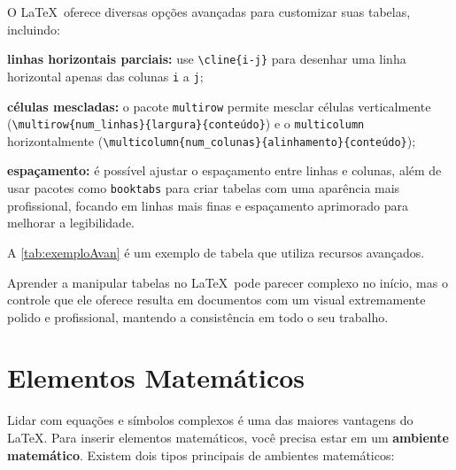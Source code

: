 O \LaTeX\  oferece diversas opções avançadas para customizar suas tabelas, incluindo:

\begin{alineas}
	\item \textbf{linhas horizontais parciais:} use \texttt{\textbackslash cline\{i-j\}} para desenhar uma linha horizontal apenas das colunas \texttt{i} a \texttt{j};
	\item \textbf{células mescladas:} o pacote \texttt{multirow} permite mesclar células verticalmente\\ (\texttt{\textbackslash multirow\{num\_linhas\}\{largura\}\{conteúdo\}}) e o \texttt{multicolumn}\\ horizontalmente (\texttt{\textbackslash multicolumn\{num\_colunas\}\{alinhamento\}\{conteúdo\}});
	\item \textbf{espaçamento:} é possível ajustar o espaçamento entre linhas e colunas, além de usar pacotes como \texttt{booktabs} para criar tabelas com uma aparência mais profissional, focando em linhas mais finas e espaçamento aprimorado para melhorar a legibilidade.
\end{alineas}
A \autoref{tab:exemploAvan} é um exemplo de tabela que utiliza recursos avançados.

\vspace{\baselineskip}
Aprender a manipular tabelas no \LaTeX\  pode parecer complexo no início, mas o controle que ele oferece resulta em documentos com um visual extremamente polido e profissional, mantendo a consistência em todo o seu trabalho.


\section{Elementos Matemáticos}

Lidar com equações e símbolos complexos é uma das maiores vantagens do \LaTeX. Para inserir elementos matemáticos, você precisa estar em um \textbf{ambiente matemático}. Existem dois tipos principais de ambientes matemáticos:

